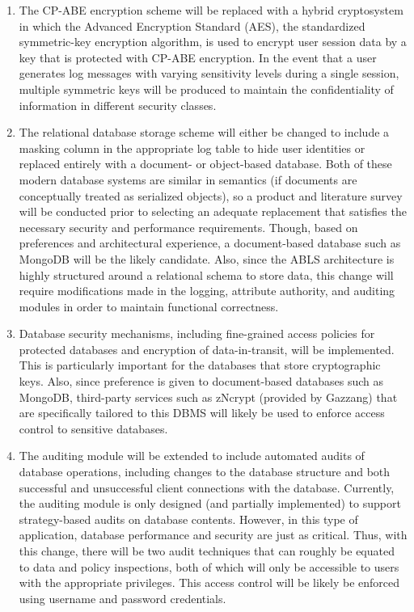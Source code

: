 \documentclass{sig-alternate}
\begin{document}
\begin{enumerate}
	\item The CP-ABE encryption scheme will be replaced with a hybrid cryptosystem in which the Advanced
	Encryption Standard (AES), the standardized symmetric-key encryption algorithm, is used to encrypt user
	session data by a key that is protected with CP-ABE encryption. In the event that a user generates log messages
	with varying sensitivity levels during a single session, multiple symmetric keys will be produced to maintain
	the confidentiality of information in different security classes.
	\item The relational database storage scheme will either be changed to include a masking column in the appropriate
	log table to hide user identities or replaced entirely with a document- or object-based database. Both of these
	modern database systems are similar in semantics (if documents are conceptually treated as serialized objects),
	so a product and literature survey will be conducted prior to selecting an adequate replacement that satisfies
	the necessary security and performance requirements. Though, based on preferences and architectural experience,
	a document-based database such as MongoDB will be the likely candidate. Also, since the ABLS architecture is highly
	structured around a relational schema to store data, this change will require modifications made in the logging, attribute authority, 
	and auditing modules in order to maintain functional correctness. 
	\item Database security mechanisms, including fine-grained access policies for protected databases and encryption of data-in-transit, 
	will be implemented. This is particularly
	important for the databases that store cryptographic keys. Also, since preference is given to document-based databases such as MongoDB,
	third-party services such as zNcrypt (provided by Gazzang) that are specifically tailored to this DBMS will likely be used to enforce 
	access control to sensitive databases.
	\item The auditing module will be extended to include automated audits of database operations, including changes
	to the database structure and both successful and unsuccessful client connections with the database. Currently,
	the auditing module is only designed (and partially implemented) to support strategy-based audits on database contents. However,
	in this type of application, database performance and security are just as critical. Thus, with this change, there will be two audit 
	techniques that can roughly be equated to data and policy inspections, both of which will only be accessible to users with the
	appropriate privileges. This access control will be likely be enforced using username and password credentials.
\end{enumerate}
\end{document}
